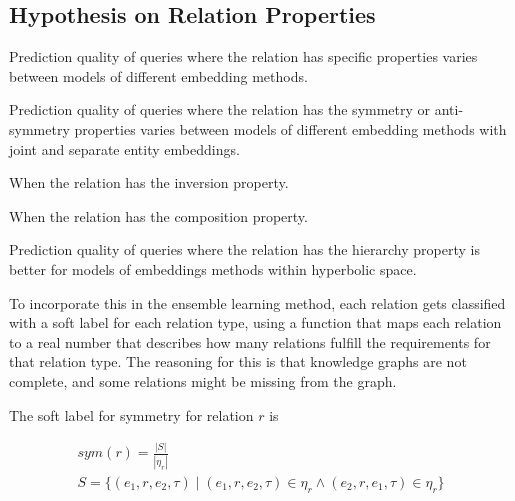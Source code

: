 \subsection{Hypothesis on Relation Properties}
\label{sec:hypothesis_relation_properties}

\begin{hypothesis}
\label{hyp:relation_properties}
Prediction quality of queries where the relation has specific properties varies between models of different embedding methods.
\end{hypothesis}

\begin{subhypothesis}
Prediction quality of queries where the relation has the symmetry or anti-symmetry properties varies between models of different embedding methods with joint and separate entity embeddings.
\end{subhypothesis}

\begin{subhypothesis}
When the relation has the inversion property.
\end{subhypothesis}

\begin{subhypothesis}
When the relation has the composition property.
\end{subhypothesis}

\begin{subhypothesis}
Prediction quality of queries where the relation has the hierarchy property is better for models of embeddings methods within hyperbolic space.
\end{subhypothesis}

To incorporate this in the ensemble learning method, each relation gets classified with a soft label for each relation type, using a function that maps each relation to a real number that describes how many relations fulfill the requirements for that relation type. The reasoning for this is that knowledge graphs are not complete, and some relations might be missing from the graph.

The soft label for symmetry for relation $r$ is

\begin{equation}
\begin{gathered}
\mathit{sym}(r) = \frac{|S|}{|\eta_r|}\\
S = \{ (e_1, r, e_2, \tau) \mid (e_1, r, e_2, \tau) \in \eta_r \wedge (e_2, r, e_1, \tau) \in \eta_r \}
\end{gathered}
\end{equation}

